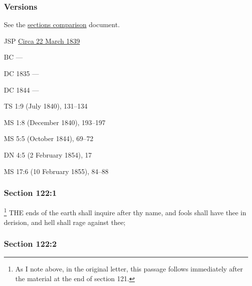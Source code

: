 	\subsubsection{Versions}
		\label{DC122-V}
		
		See the \href{https://drive.google.com/file/d/1goAvNz8jS4R8slYfMG_db55Ty2z_vmgK/view?usp=sharing}{sections comparison} document.
	
		\begin{compactdesc}
			\item[JSP] \hyperref[EMS-1839-JS-CIR-22-MAR-1839]{Circa 22 March 1839}
			\item[BC] ---
			\item[DC 1835] ---
			\item[DC 1844] ---
			\item[TS] 1:9 (July 1840), 131--134
			\item[MS] 1:8 (December 1840), 193--197
			\item[MS] 5:5 (October 1844), 69--72
			\item[DN] 4:5 (2 February 1854), 17
			\item[MS] 17:6 (10 February 1855), 84--88
		\end{compactdesc}

	\subsubsection{Section 122:1} %
		\label{DC122-1}

			\footnote{%
				As I note above, in the original letter, this passage follows immediately after the material at the end of section 121.
				}%
		THE ends of the earth shall inquire after thy name, and fools shall have thee in derision, and hell shall rage against thee;


	\subsubsection{Section 122:2} %
		\label{DC122-2}

